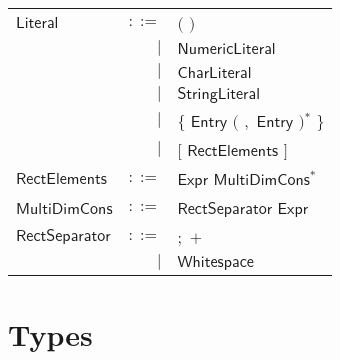  
\begin{longtable}[l]{p{3cm}rl}
$\mathsf{Literal}$ &  $\mathsf{::=}$  & $\mathbf{(}$ $\mathbf{)}$ \\
 & $\big|$ &  $\mathsf{NumericLiteral}$ \\
 & $\big|$ &  $\mathsf{CharLiteral}$ \\
 & $\big|$ &  $\mathsf{StringLiteral}$ \\
 & $\big|$ &  $\mathbf{\{}$ $\mathsf{Entry}$ $\big($  $\mathbf{,}$ $\mathsf{Entry}$ $\big)$$^*$ $\mathbf{\}}$ \\
 & $\big|$ &  $\mathbf{[}$ $\mathsf{RectElements}$ $\mathbf{]}$ \\
$\mathsf{RectElements}$ &  $\mathsf{::=}$  & $\mathsf{Expr}$ $\mathsf{MultiDimCons}$$^*$ \\
$\mathsf{MultiDimCons}$ &  $\mathsf{::=}$  & $\mathsf{RectSeparator}$ $\mathsf{Expr}$ \\
$\mathsf{RectSeparator}$ &  $\mathsf{::=}$  & $\mathbf{;}$ $\mathbf{+}$ \\
 & $\big|$ &  $\mathsf{Whitespace}$ \\
\end{longtable} \hfill 

\section{Types} 

